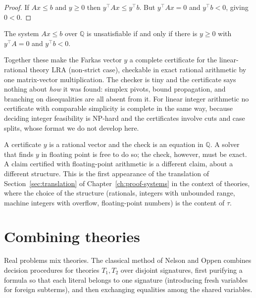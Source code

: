 \begin{proof}
If $Ax\le b$ and $y\ge0$ then $y^{\top}Ax\le y^{\top}b$. But $y^{\top}Ax=0$ and $y^{\top}b<0$, giving $0<0$.
\end{proof}

\begin{theorem}
\label{thm:farkas}
 The system $Ax\le b$ over $\mathbb{Q}$ is unsatisfiable if and only if there is $y\ge0$ with $y^{\top}A=0$ and $y^{\top}b<0$.
\end{theorem}

Together these make the Farkas vector $y$ a complete certificate for the linear-rational theory $\mathrm{LRA}$ (non-strict case), checkable in exact rational arithmetic by one matrix-vector multiplication. The checker is tiny and the certificate says nothing about \emph{how} it was found: simplex pivots, bound propagation, and branching on disequalities are all absent from it. For linear integer arithmetic no certificate with comparable simplicity is complete in the same way, because deciding integer feasibility is $\mathrm{NP}$-hard and the certificates involve cuts and case splits, whose format we do not develop here.

\begin{remark}[Exactness]
\label{rem:exact}
A certificate $y$ is a rational vector and the check is an equation in $\mathbb{Q}$. A solver that finds $y$ in floating point is free to do so; the check, however, must be exact. A claim certified with floating-point arithmetic is a different claim, about a different structure. This is the first appearance of the translation of Section~\ref{sec:translation} of Chapter~\ref{ch:proof-systems} in the context of theories, where the choice of the structure (rationals, integers with unbounded range, machine integers with overflow, floating-point numbers) is the content of $\tau$.
\end{remark}

\section{Combining theories}
\label{sec:no}

Real problems mix theories. The classical method of Nelson and Oppen combines decision procedures for theories $T_1,T_2$ over disjoint signatures, first purifying a formula so that each literal belongs to one signature (introducing fresh variables for foreign subterms), and then exchanging equalities among the shared variables.

